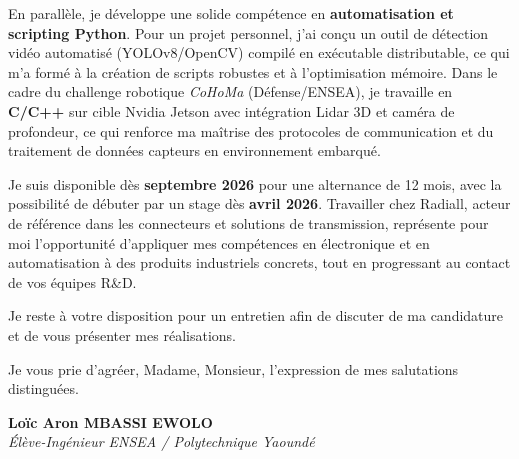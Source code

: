 \documentclass[a4paper,11pt]{article}
\begin{document}
En parallèle, je développe une solide compétence en \textbf{automatisation et scripting Python}. Pour un projet personnel, j'ai conçu un outil de détection vidéo automatisé (YOLOv8/OpenCV) compilé en exécutable distributable, ce qui m'a formé à la création de scripts robustes et à l'optimisation mémoire. Dans le cadre du challenge robotique \textit{CoHoMa} (Défense/ENSEA), je travaille en \textbf{C/C++} sur cible Nvidia Jetson avec intégration Lidar 3D et caméra de profondeur, ce qui renforce ma maîtrise des protocoles de communication et du traitement de données capteurs en environnement embarqué.

Je suis disponible dès \textbf{septembre 2026} pour une alternance de 12 mois, avec la possibilité de débuter par un stage dès \textbf{avril 2026}. Travailler chez Radiall, acteur de référence dans les connecteurs et solutions de transmission, représente pour moi l'opportunité d'appliquer mes compétences en électronique et en automatisation à des produits industriels concrets, tout en progressant au contact de vos équipes R\&D.

Je reste à votre disposition pour un entretien afin de discuter de ma candidature et de vous présenter mes réalisations.

Je vous prie d'agréer, Madame, Monsieur, l'expression de mes salutations distinguées.

\vspace{0.8cm}

\textbf{Loïc Aron MBASSI EWOLO}\\
\textit{Élève-Ingénieur ENSEA / Polytechnique Yaoundé}
\end{document}
